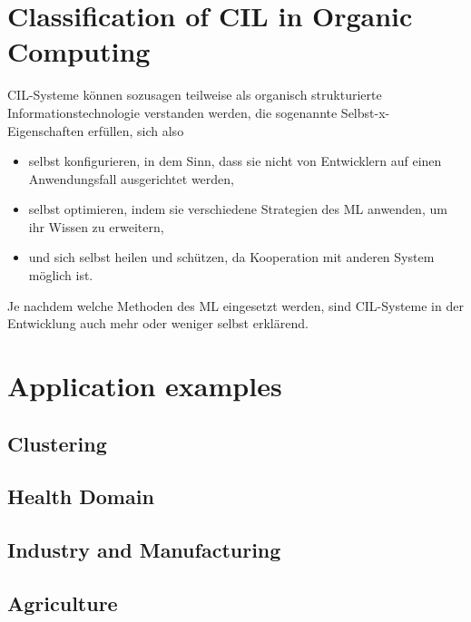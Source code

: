 \documentclass[conference,compsoc]{IEEEtran}
\begin{document}
\section{Classification of CIL in Organic Computing}
CIL-Systeme können sozusagen teilweise als organisch strukturierte Informationstechnologie verstanden 
werden, die sogenannte Selbst-x-Eigenschaften erfüllen\cite{Organic:schloer}\cite{Organic:schmeck}, 
sich also 
\begin{itemize}
    \item selbst konfigurieren, in dem Sinn, dass sie nicht von Entwicklern auf einen 
        Anwendungsfall ausgerichtet werden, 
    \item selbst optimieren, indem sie verschiedene Strategien des ML anwenden, um ihr 
        Wissen zu erweitern, 
    \item und sich selbst heilen und schützen, da Kooperation mit anderen System möglich ist.
\end{itemize}
Je nachdem welche Methoden des ML eingesetzt werden, sind CIL-Systeme in der Entwicklung auch 
mehr oder weniger selbst erklärend\cite{Organic:schloer}.

\section{Application examples}
\subsection{Clustering}


\subsection{Health Domain}


\subsection{Industry and Manufacturing}


\subsection{Agriculture}
\end{document}
